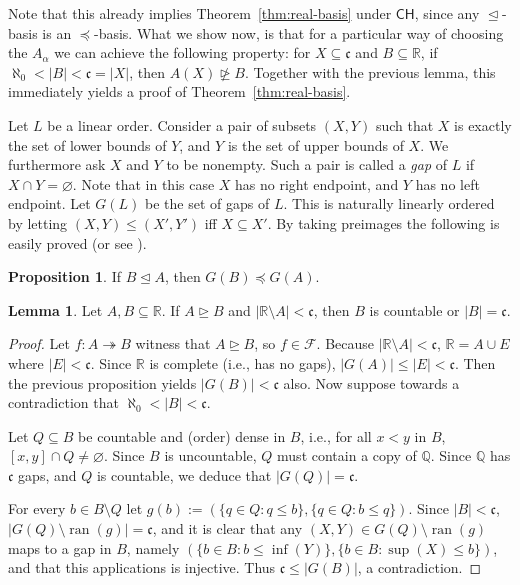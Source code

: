\documentclass[10pt]{amsart}
\theoremstyle{definition}
\newtheorem{lemma}[theorem]{Lemma}
\newtheorem{proposition}[theorem]{Proposition}
\theoremstyle{remark}
\newcommand{\es}{\varnothing}
\newcommand{\seb}{\subseteq}
\newcommand{\setm}{\setminus}
\newcommand{\axiom}[1]{\mathsf{#1}}
\newcommand{\CH}{\axiom{CH}}
\newcommand{\eleq}{\preceq}
\newcommand{\sleq}{\trianglelefteq}
\newcommand{\sgeq}{\trianglerighteq}
\newcommand{\nsgeq}{\ntrianglerighteq}
\newcommand{\sur}{\twoheadrightarrow}
\newcommand{\1}{\mathbbm{1}}
\newcommand{\cc}{\mathfrak{c}}
\newcommand{\sF}{\mathscr{F}}
\DeclareMathOperator{\ran}{ran}
\begin{document}
Note that this already implies Theorem~\ref{thm:real-basis} under $\CH$,
since any $\sleq$-basis is an $\eleq$-basis. What we show now, is that
for a particular way of choosing the $A_{\alpha}$ we can achieve the
following property: for $X \seb \cc$ and $B \seb \mathbb{R}$,
if $\aleph_{0} < |B| < \cc = |X|$, then $A(X) \nsgeq B$.
Together with the previous lemma, this immediately
yields a proof of Theorem~\ref{thm:real-basis}.

Let $L$ be a linear order. Consider a pair
of subsets $(X,Y)$ such that $X$ is exactly the
set of lower bounds of $Y$, and $Y$ is the set of
upper bounds of $X$. We furthermore ask $X$ and
$Y$ to be nonempty. Such a pair is called a \emph{gap}
of $L$ if $X \cap Y = \es$. Note that in this case
$X$ has no right endpoint, and $Y$ has no left endpoint.
Let $G(L)$ be the set of gaps of $L$. This is naturally
linearly ordered by letting $(X,Y) \le (X',Y')$ iff
$X \seb X'$. By taking preimages the following
is easily proved (or see \cite[Proposition~5.3]{CamerloEtAl2019}).

\begin{proposition}
  If $B \sleq A$, then $G(B) \eleq G(A)$.
\end{proposition}

\begin{lemma}\label{prop:gaps}
  Let $A,B \seb \mathbb{R}$. If  $A \sgeq B$ and $|\mathbb{R}\setm A| < \cc$,
  then $B$ is countable or $|B| = \cc$.
\end{lemma}
\begin{proof}
  Let $f : A \sur B$ witness that $A \sgeq B$, so $f \in \sF$. Because
  $|\mathbb{R}\setm A| < \cc$, $\mathbb{R}= A \cup E$ where
  $|E| < \cc$. Since $\mathbb{R}$ is complete (i.e., has no
  gaps), $|G(A)| \le |E| < \cc$. Then the previous proposition yields
  $|G(B)| < \cc$ also. Now suppose towards a contradiction
  that $\aleph_{0} < |B| < \cc$.

  Let $Q \seb B$ be countable and (order) dense in $B$, i.e.,
  for all $x < y$ in $B$, $[x,y] \cap Q \neq \es$. Since
  $B$ is uncountable, $Q$ must contain a copy of $\mathbb{Q}$.
  Since $\mathbb{Q}$ has $\cc$ gaps, and $Q$ is countable,
  we deduce that $|G(Q)| = \cc$.

  For every $b \in B \setm Q$ let
  $g(b) := (\{q \in Q : q \le b\},\{q \in Q : b \le q\})$.
  Since $|B| < \cc$, $|G(Q) \setm \ran(g)| = \cc$,
  and it is clear that any $(X,Y) \in G(Q) \setm \ran(g)$
  maps to a gap in $B$, namely
  $(\{b \in B : b \le \inf(Y)\},\{b \in B : \sup(X) \le b\})$,
  and that this applications is injective. Thus
  $\cc \le |G(B)|$, a contradiction.
\end{proof}
\end{document}
